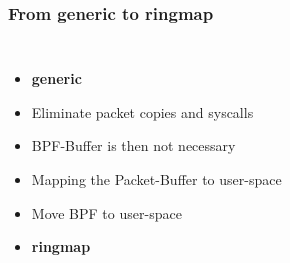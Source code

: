 \documentclass{beamer}
\begin{document}
\begin{frame}
\frametitle{From generic to ringmap}
\begin{columns}
\vspace{-1em}
\begin{itemize}
	\item<1->\textbf{generic}
	\item<2->Eliminate packet copies  and syscalls
	\item<3->BPF-Buffer is then not necessary
	\item<4->Mapping the Packet-Buffer to user-space
	\item<5->Move BPF to user-space\newline
	\item<6->[$\Rightarrow$]\textbf{ringmap}
\end{itemize}
\vspace{-2em}

\end{columns}
\end{frame}
\end{document}

